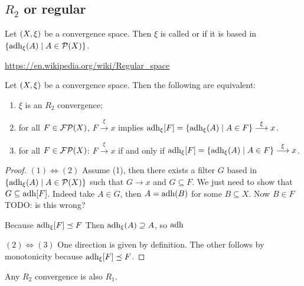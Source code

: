 \subsection{$R_2$ or regular}
\begin{definition}
Let $\left( X,\xi \right)$ be a convergence space. Then $\xi$ is called  or  if it is based in $\left\{ \operatorname{adh}_\xi(A) \;\middle|\; A\in\operatorname{\mathcal{P}}(X) \right\}$.
\end{definition}

\url{https://en.wikipedia.org/wiki/Regular_space}

\begin{proposition}
Let $\left( X,\xi \right)$ be a convergence space. Then the following are equivalent:
\begin{enumerate}
\item $\xi$ is an $R_2$ convergence;
\item for all $F\in\operatorname{\mathcal{FP}}(X)$, $F\overset{\xi}{\longrightarrow} x$ implies $\operatorname{adh}_\xi[F] = \left\{ \operatorname{adh}_\xi(A) \;\middle|\; A\in F \right\} \overset{\xi}{\longrightarrow} x$.
\item for all $F\in\operatorname{\mathcal{FP}}(X)$: $F\overset{\xi}{\longrightarrow} x$ \textup{if and only if} $\operatorname{adh}_\xi[F] = \left\{ \operatorname{adh}_\xi(A) \;\middle|\; A\in F \right\} \overset{\xi}{\longrightarrow} x$.
\end{enumerate}
\end{proposition}
\begin{proof}
$(1) \Leftrightarrow (2)$ Assume (1), then there exists a filter $G$ based in $\left\{ \operatorname{adh}_\xi(A) \;\middle|\; A\in\operatorname{\mathcal{P}}(X) \right\}$ such that $G\to x$ and $G\subseteq F$. We just need to show that $G\subseteq \operatorname{adh}[F]$. Indeed take $A\in G$, then $A = \operatorname{adh}(B)$ for some $B\subseteq X$. Now $B\in F$ TODO: is this wrong?

Because $\operatorname{adh}_\xi[F]\preceq F$ Then $\operatorname{adh}_\xi(A) \supseteq A$, so $\operatorname{adh}$ 

$(2) \Leftrightarrow (3)$ One direction is given by definition. The other follows by monotonicity because $\operatorname{adh}_\xi[F] \preceq F$.
\end{proof}

\begin{lemma}
Any $R_2$ convergence is also $R_1$.
\end{lemma}

